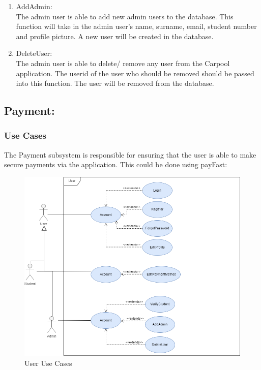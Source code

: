 \documentclass[hidelinks, 12pt, a4paper]{article}
\begin{document}
\begin{enumerate}[label=U1.\arabic*]
                \item AddAdmin:\\
                	The admin user is able to add new admin users to the database. This function will take in the admin user’s name, surname, email, student number and profile picture. A new user will be created in the database.
                	
                \item DeleteUser: \\
                    The admin user is able to delete/ remove any user from the Carpool application. The userid of the user who should be removed should be passed into this function. The user will be removed from the database.
                    
                    \end{enumerate}
                    
\newpage
                \subsection{Payment:}
                \subsubsection{Use Cases}
                  The Payment subsystem is responsible for ensuring that the user is able to make secure payments via the application. This could be done using payFast:
                    
                    \begin{figure}[H]
                    
                        \centering
                        \includegraphics[width=15cm]{images/User Usecase.drawio.png}
                        \caption{User Use Cases}
                        \label{fig:User UseCases}
                        
                    \end{figure}
                    
\end{document}
